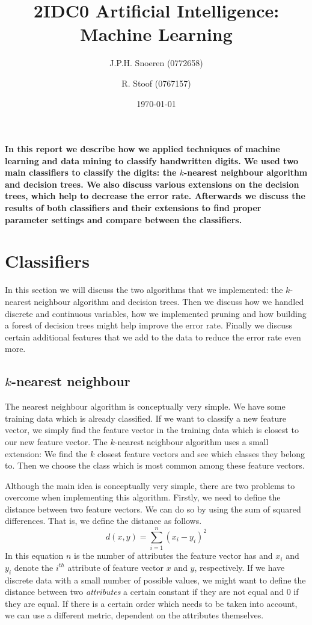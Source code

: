 \documentclass[10pt,a4paper]{article}
\author{J.P.H. Snoeren (0772658) \and R. Stoof (0767157)}
\date{\today}
\title{2IDC0 Artificial Intelligence: Machine Learning}
\begin{document}
\maketitle
\textbf{In this report we describe how we applied techniques of machine learning and data mining to classify handwritten digits. We used two main classifiers to classify the digits: the $k$-nearest neighbour algorithm and decision trees. We also discuss various extensions on the decision trees, which help to decrease the error rate. Afterwards we discuss the results of both classifiers and their extensions to find proper parameter settings and compare between the classifiers.} 

\section{Classifiers}
In this section we will discuss the two algorithms that we implemented: the $k$-nearest neighbour algorithm and decision trees. Then we discuss how we handled discrete and continuous variables, how we implemented pruning and how building a forest of decision trees might help improve the error rate. Finally we discuss certain additional features that we add to the data to reduce the error rate even more.
\subsection{$k$-nearest neighbour}
The nearest neighbour algorithm is conceptually very simple. We have some training data which is already classified. If we want to classify a new feature vector, we simply find the feature vector in the training data which is closest to our new feature vector. The $k$-nearest neighbour algorithm uses a small extension: We find the $k$ closest feature vectors and see which classes they belong to. Then we choose the class which is most common among these feature vectors. 

Although the main idea is conceptually very simple, there are two problems to overcome when implementing this algorithm. Firstly, we need to define the distance between two feature vectors. We can do so by using the sum of squared differences. That is, we define the distance as follows.
\begin{equation*}
d(x,y) = \sum_{i=1}^n (x_i - y_i)^2 
\end{equation*}
In this equation $n$ is the number of attributes the feature vector has and $x_i$ and $y_i$ denote the $i^{th}$ attribute of feature vector $x$ and $y$, respectively. If we have discrete data with a small number of possible values, we might want to define the distance between two \emph{attributes} a certain constant if they are not equal and 0 if they are equal. If there is a certain order which needs to be taken into account, we can use a different metric, dependent on the attributes themselves.
\end{document}
